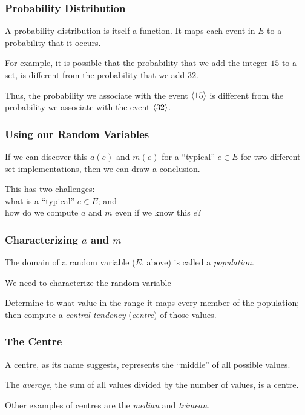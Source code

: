 \begin{frame}
\frametitle{Probability Distribution}
\begin{changemargin}{1cm}

A probability distribution is itself a function. 
It maps
each event in $E$ to a probability that it occurs.

For example, it is possible that the
probability that we add the integer $15$ to a set,
is different from the probability that we add $32$.

Thus, the probability we associate with the event
$\langle 15 \rangle$ is different from the probability
we associate with the event $\langle 32 \rangle$.

\end{changemargin}
\end{frame}


\begin{frame}
\frametitle{Using our Random Variables}
\begin{changemargin}{1cm}

If we can discover this $a(e)$ and $m(e)$
for a ``typical'' $e \in E$ for
two different set-implementations, then we can draw a conclusion.


This has two challenges: \\
\quad what is a ``typical'' $e \in E$; and\\
\quad how do we compute $a$ and $m$ even if we know this $e$?

\end{changemargin}
\end{frame}


\begin{frame}
\frametitle{Characterizing $a$ and $m$}
\begin{changemargin}{1cm}

The domain of a random variable ($E$, above) is called a
\emph{population}. 

We need to characterize the random variable

Determine to what value in the range it maps every member of
the population; then compute a \emph{central tendency} (\emph{centre}) of those values.

\end{changemargin}
\end{frame}


\begin{frame}
\frametitle{The Centre}
\begin{changemargin}{1cm}

A centre, as its name suggests, represents the ``middle'' of
all possible values. 

The \emph{average}, the sum of all values
divided by the number of values, is a centre. 

Other examples of
centres are the \emph{median} and \emph{trimean}.

\end{changemargin}
\end{frame}


